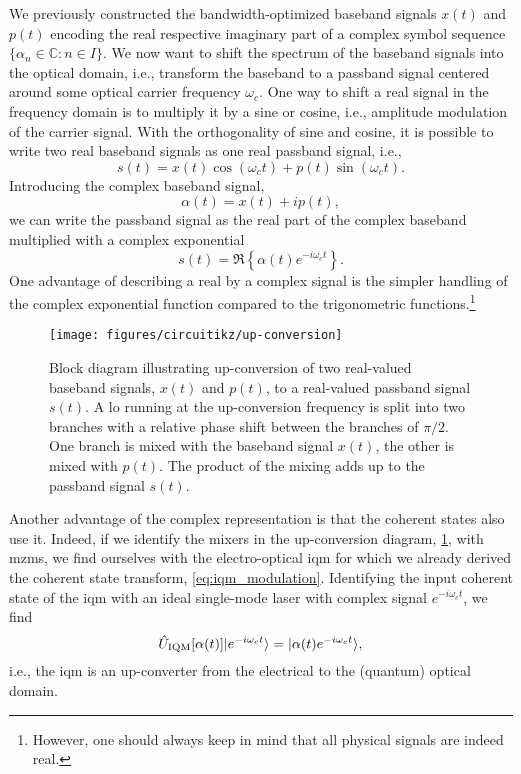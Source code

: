 We previously constructed the bandwidth-optimized baseband signals $x(t)$ and $p(t)$ encoding the real respective imaginary part of a complex symbol sequence $\{\alpha_n\in\mathbb{C}\colon n\in I\}$.
We now want to shift the spectrum of the baseband signals into the optical domain, i.e., transform the baseband to a passband signal centered around some optical carrier frequency $\omega_c$.
One way to shift a real signal in the frequency domain is to multiply it by a sine or cosine, i.e., amplitude modulation of the carrier signal.
With the orthogonality of sine and cosine, it is possible to write two real baseband signals as one real passband signal, i.e.,
\begin{equation}
	s(t)
	=
	x(t)
	\cos(\omega_ct)
	+
	p(t)
	\sin(\omega_ct)
	.
\end{equation}
Introducing the complex baseband signal,
\begin{equation}
	\alpha(t)
	=
	x(t)
	+
	ip(t)
	,
\end{equation}
we can write the passband signal as the real part of the complex baseband multiplied with a complex exponential
\begin{equation}
	s(t)
	=
	\Re\left\{
		\alpha(t)
		e^{-i\omega_ct}
	\right\}
	.
	\label{eq:real_complex_passband}
\end{equation}
One advantage of describing a real by a complex signal is the simpler handling of the complex exponential function compared to the trigonometric functions.\footnote{However, one should always keep in mind that all physical signals are indeed real.}
\begin{figure}[htb]
	\centering
	\texttt{[image: figures/circuitikz/up-conversion]}
	\caption{Block diagram illustrating up-conversion of two real-valued baseband signals, $x(t)$ and $p(t)$, to a real-valued passband signal $s(t)$. A \gls{lo} running at the up-conversion frequency is split into two branches with a relative phase shift between the branches of $\pi/2$. One branch is mixed with the baseband signal $x(t)$, the other is mixed with $p(t)$. The product of the mixing adds up to the passband signal $s(t)$.}\label{fig:up_conversion}
\end{figure}
Another advantage of the complex representation is that the coherent states also use it.
Indeed, if we identify the mixers in the up-conversion diagram, \cref{fig:up_conversion}, with \gls{mzm}s, we find ourselves with the electro-optical \gls{iqm} for which we already derived the coherent state transform, \cref{eq:iqm_modulation}.
Identifying the input coherent state of the \gls{iqm} with an ideal single-mode laser with complex signal $e^{-i\omega_ct}$, we find
\begin{equation}
	\hat{U}_\text{IQM}[\alpha(t)]
	\lvert e^{-i\omega_ct}\rangle
	=
	\lvert\alpha(t)e^{-i\omega_ct}\rangle
	,
\end{equation}
i.e., the \gls{iqm} is an up-converter from the electrical to the (quantum) optical domain.